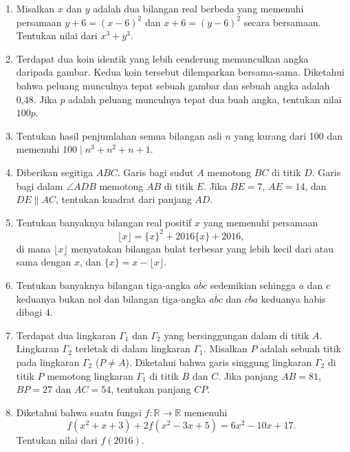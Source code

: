 \documentclass[bahasa, a4paper,12pt]{article}
\begin{document}
\begin{enumerate}

\item Misalkan $x$ dan $y$ adalah dua bilangan real berbeda yang memenuhi persamaan $y+6=(x-6)^2$ dan $x+6=(y-6)^2$ secara bersamaan. Tentukan nilai dari $x^3+y^3$.

\item Terdapat dua koin identik yang lebih cenderung memunculkan angka daripada gambar. Kedua koin tersebut dilemparkan bersama-sama. Diketahui bahwa peluang munculnya tepat sebuah gambar dan sebuah angka adalah 0,48. Jika $p$ adalah peluang munculnya tepat dua buah angka, tentukan nilai $100p$.

\item Tentukan hasil penjumlahan semua bilangan asli $n$ yang kurang dari 100 dan memenuhi $100\mid n^3+n^2+n+1$.

\item Diberikan segitiga $ABC$. Garis bagi sudut $A$ memotong $BC$ di titik $D$. Garis bagi dalam $\angle ADB$ memotong $AB$ di titik $E$. Jika $BE=7$, $AE=14$, dan $DE\parallel AC$, tentukan kuadrat dari panjang $AD$.

\item  Tentukan banyaknya bilangan real positif $x$ yang memenuhi persamaan \[\lfloor{x}\rfloor=\{x\}^2+2016\{x\}+2016,\] di mana $\lfloor{x}\rfloor$ menyatakan bilangan bulat terbesar yang lebih kecil dari atau sama dengan $x$, dan $\{x\}=x-\lfloor{x}\rfloor$.

\item Tentukan banyaknya bilangan tiga-angka $\overline{abc}$ sedemikian sehingga $a$ dan $c$ keduanya bukan nol dan bilangan tiga-angka $\overline{abc}$ dan $\overline{cba}$ keduanya habis dibagi 4.

\item Terdapat dua lingkaran $\Gamma_{1}$ dan $\Gamma_{2}$ yang bersinggungan dalam di titik $A$. Lingkaran $\Gamma_{2}$ terletak di dalam lingkaran $\Gamma_{1}$. Misalkan $P$ adalah sebuah titik pada lingkaran $\Gamma_{2}$ ($P\neq A$). Diketahui bahwa garis singgung lingkaran $\Gamma_{2}$ di titik $P$ memotong lingkaran $\Gamma_{1}$ di titik $B$ dan $C$. Jika panjang $AB=81$, $BP=27$ dan $AC=54$, tentukan panjang $CP$.

\item Diketahui bahwa suatu fungsi $f: \mathbb{R} \rightarrow \mathbb{R}$ memenuhi \[ f(x^2+x+3)+2f(x^2-3x+5) = 6x^2-10x+17. \] Tentukan nilai dari $f(2016)$.


\end{enumerate}
\end{document}
